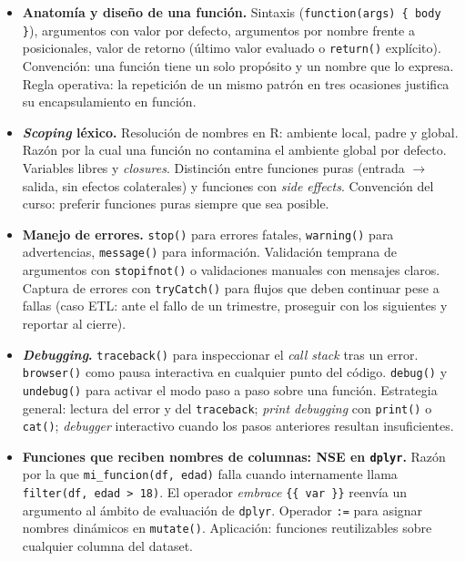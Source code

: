 \documentclass[11pt,letterpaper]{article}
\begin{document}
\begin{itemize}[leftmargin=*, itemsep=2pt]
    \item \textbf{Anatomía y diseño de una función.} Sintaxis (\texttt{function(args) \{ body \}}), argumentos con valor por defecto, argumentos por nombre frente a posicionales, valor de retorno (último valor evaluado o \texttt{return()} explícito). Convención: una función tiene un solo propósito y un nombre que lo expresa. Regla operativa: la repetición de un mismo patrón en tres ocasiones justifica su encapsulamiento en función.
    \item \textbf{\textit{Scoping} léxico.} Resolución de nombres en R: ambiente local, padre y global. Razón por la cual una función no contamina el ambiente global por defecto. Variables libres y \textit{closures}. Distinción entre funciones puras (entrada $\to$ salida, sin efectos colaterales) y funciones con \textit{side effects}. Convención del curso: preferir funciones puras siempre que sea posible.
    \item \textbf{Manejo de errores.} \texttt{stop()} para errores fatales, \texttt{warning()} para advertencias, \texttt{message()} para información. Validación temprana de argumentos con \texttt{stopifnot()} o validaciones manuales con mensajes claros. Captura de errores con \texttt{tryCatch()} para flujos que deben continuar pese a fallas (caso ETL: ante el fallo de un trimestre, proseguir con los siguientes y reportar al cierre).
    \item \textbf{\textit{Debugging}.} \texttt{traceback()} para inspeccionar el \textit{call stack} tras un error. \texttt{browser()} como pausa interactiva en cualquier punto del código. \texttt{debug()} y \texttt{undebug()} para activar el modo paso a paso sobre una función. Estrategia general: lectura del error y del \texttt{traceback}; \textit{print debugging} con \texttt{print()} o \texttt{cat()}; \textit{debugger} interactivo cuando los pasos anteriores resultan insuficientes.
    \item \textbf{Funciones que reciben nombres de columnas: NSE en \texttt{dplyr}.} Razón por la que \texttt{mi\_funcion(df, edad)} falla cuando internamente llama \texttt{filter(df, edad > 18)}. El operador \textit{embrace} \texttt{\{\{~var~\}\}} reenvía un argumento al ámbito de evaluación de \texttt{dplyr}. Operador \texttt{:=} para asignar nombres dinámicos en \texttt{mutate()}. Aplicación: funciones reutilizables sobre cualquier columna del dataset.
\end{itemize}
\end{document}
